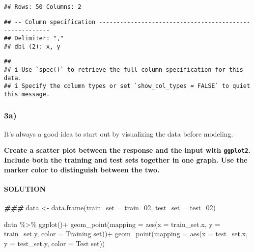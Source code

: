 \documentclass[
]{article}
\newenvironment{Shaded}{\begin{snugshade}}{\end{snugshade}}
\newcommand{\AttributeTok}[1]{\textcolor[rgb]{0.77,0.63,0.00}{#1}}
\newcommand{\DocumentationTok}[1]{\textcolor[rgb]{0.56,0.35,0.01}{\textbf{\textit{#1}}}}
\newcommand{\FunctionTok}[1]{\textcolor[rgb]{0.00,0.00,0.00}{#1}}
\newcommand{\NormalTok}[1]{#1}
\newcommand{\OtherTok}[1]{\textcolor[rgb]{0.56,0.35,0.01}{#1}}
\newcommand{\SpecialCharTok}[1]{\textcolor[rgb]{0.00,0.00,0.00}{#1}}
\newcommand{\StringTok}[1]{\textcolor[rgb]{0.31,0.60,0.02}{#1}}
\begin{document}
\begin{verbatim}
## Rows: 50 Columns: 2
\end{verbatim}

\begin{verbatim}
## -- Column specification --------------------------------------------------------
## Delimiter: ","
## dbl (2): x, y
\end{verbatim}

\begin{verbatim}
## 
## i Use `spec()` to retrieve the full column specification for this data.
## i Specify the column types or set `show_col_types = FALSE` to quiet this message.
\end{verbatim}

\hypertarget{a-2}{%
\subsubsection{3a)}\label{a-2}}

It's always a good idea to start out by visualizing the data before
modeling.

\textbf{Create a scatter plot between the response and the input with
\texttt{ggplot2}. Include both the training and test sets together in
one graph. Use the marker color to distinguish between the two.}

\hypertarget{solution-12}{%
\paragraph{SOLUTION}\label{solution-12}}

\begin{Shaded}
\begin{Highlighting}[]
\DocumentationTok{\#\#\#}
\NormalTok{data }\OtherTok{\textless{}{-}} \FunctionTok{data.frame}\NormalTok{(}\AttributeTok{train\_set =}\NormalTok{ train\_02, }\AttributeTok{test\_set =}\NormalTok{ test\_02)}

\NormalTok{data }\SpecialCharTok{\%\textgreater{}\%}
  \FunctionTok{ggplot}\NormalTok{()}\SpecialCharTok{+}
  \FunctionTok{geom\_point}\NormalTok{(}\AttributeTok{mapping =} \FunctionTok{aes}\NormalTok{(}\AttributeTok{x =}\NormalTok{ train\_set.x, }\AttributeTok{y =}\NormalTok{ train\_set.y, }\AttributeTok{color =} \StringTok{\textquotesingle{}Training set\textquotesingle{}}\NormalTok{))}\SpecialCharTok{+}
  \FunctionTok{geom\_point}\NormalTok{(}\AttributeTok{mapping =} \FunctionTok{aes}\NormalTok{(}\AttributeTok{x =}\NormalTok{ test\_set.x, }\AttributeTok{y =}\NormalTok{ test\_set.y, }\AttributeTok{color =} \StringTok{\textquotesingle{}Test set\textquotesingle{}}\NormalTok{))}
\end{Highlighting}
\end{Shaded}
\end{document}
